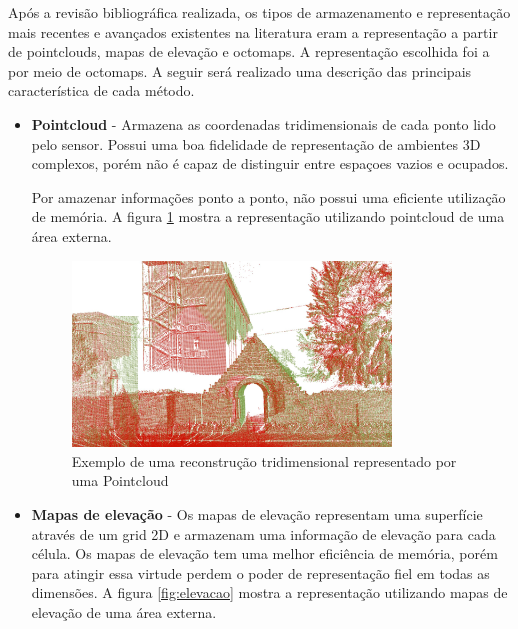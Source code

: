 Após a revisão bibliográfica realizada, os tipos de armazenamento e representação mais recentes e avançados existentes na literatura eram a representação a partir de pointclouds, mapas de elevação e octomaps. A representação escolhida foi a por meio de octomaps. A seguir será realizado uma descrição das principais característica de cada método.
\begin{itemize}
    \item \textbf{Pointcloud} - Armazena as coordenadas tridimensionais de cada ponto lido pelo sensor. Possui uma boa fidelidade de representação de ambientes 3D complexos, porém não é capaz de distinguir entre espaçoes vazios e ocupados.

    Por amazenar informações ponto a ponto, não possui uma eficiente utilização de memória. A figura \ref{fig:pointcloud} mostra a representação utilizando pointcloud de uma área externa.

    \begin{figure}[H]
    \centering
    \includegraphics[width=0.8\textwidth]{figs/3d/registration_closeup}
    \caption{Exemplo de uma reconstrução tridimensional representado por uma Pointcloud}
    \label{fig:pointcloud}
\end{figure}


    \item \textbf{Mapas de elevação} - Os mapas de elevação representam uma superfície através de um grid 2D e armazenam uma informação de elevação para cada célula. Os mapas de elevação tem uma melhor eficiência de memória, porém para atingir essa virtude perdem o poder de representação fiel em todas as dimensões. A figura \ref{fig:elevacao} mostra a representação utilizando mapas de elevação de uma área externa.


\end{itemize}
